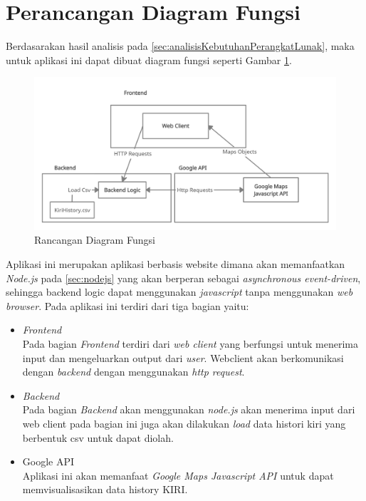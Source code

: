 \section{Perancangan Diagram Fungsi}
\label{sec:perancanganDiagramFungsi}
Berdasarakan hasil analisis pada  \ref{sec:analisisKebutuhanPerangkatLunak}, maka untuk aplikasi ini dapat dibuat diagram fungsi seperti Gambar \ref{fig:diagramFungsi}. 
\begin{figure}[H]
	\centering  
	\includegraphics[scale=0.3]{Gambar/Kiri_functional_diagram.png}  
	\caption[Rancangan Diagram Kelas]{Rancangan Diagram Fungsi} 
	\label{fig:diagramFungsi} 
\end{figure}

Aplikasi ini merupakan aplikasi berbasis website dimana akan memanfaatkan \textit{Node.js} pada \ref{sec:nodejs} yang akan berperan sebagai \textit{asynchronous event-driven}, sehingga  backend logic dapat menggunakan \textit{javascript} tanpa menggunakan \textit{web browser}. Pada aplikasi ini terdiri dari tiga bagian yaitu:
\label{sec:tigakomponenet}
\begin{itemize}
    \item \textit{Frontend} \\
    Pada bagian \textit{Frontend} terdiri dari \textit{web client} yang berfungsi untuk menerima input dan mengeluarkan output dari \textit{user}. Webclient akan berkomunikasi dengan \textit{backend} dengan menggunakan \textit{http request}.
    
    \item \textit{Backend} \\
    Pada bagian \textit{Backend} akan menggunakan \textit{node.js} akan menerima input dari web client pada bagian ini juga akan dilakukan \textit{load} data histori kiri yang berbentuk csv untuk dapat diolah.
    
    \item Google API \\
    Aplikasi ini akan memanfaat \textit{Google Maps Javascript API} untuk dapat memvisualisasikan data history KIRI.
\end{itemize}

